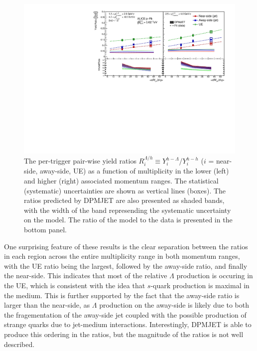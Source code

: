 \begin{figure}[h!]
\centering
\includegraphics[width=\textwidth]{figures/results/final_lambda_hadron_ratio_plot_new_x_axis_model_ratio.pdf}
\caption{The per-trigger pair-wise yield ratios $R_{i}^{\Lambda/h} \equiv Y_{i}^{h-\Lambda}$/$Y_{i}^{h-h}$ ($i$ = near-side, away-side, UE) as a function of multiplicity in the lower (left) and higher (right) associated momentum ranges. The statistical (systematic) uncertainties are shown as vertical lines (boxes). The ratios predicted by DPMJET are also presented as shaded bands, with the width of the band represending the systematic uncertainty on the model. The ratio of the model to the data is presented in the bottom panel.}
\label{fig:lambda_hadron_ratio}
\end{figure}

One surprising feature of these results is the clear separation between the ratios in each region across the entire multiplicity range in both momentum ranges, with the UE ratio being the largest, followed by the away-side ratio, and finally the near-side. This indicates that most of the relative $\Lambda$ production is occuring in the UE, which is consistent with the idea that $s$-quark production is maximal in the medium. This is further supported by the fact that the away-side ratio is larger than the near-side, as $\Lambda$ production on the away-side is likely due to both the fragementation of the away-side jet coupled with the possible production of strange quarks due to jet-medium interactions. Interestingly, DPMJET is able to produce this ordering in the ratios, but the magnitude of the ratios is not well described. 

